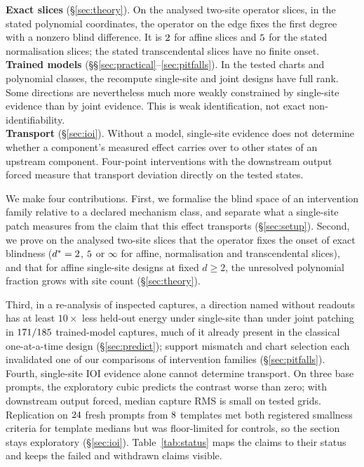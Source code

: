 \documentclass{article}
\theoremstyle{plain}
\theoremstyle{definition}
\begin{document}
\begin{tcolorbox}[title={Three kinds of claim}]
\textbf{Exact slices} (\S\ref{sec:theory}). On the analysed two-site operator slices, in the stated polynomial
coordinates, the operator on the edge fixes the first degree with a nonzero blind difference. It is $2$ for
affine slices and $5$ for the stated normalisation slices; the stated transcendental slices have no finite onset.\\[2pt]
\textbf{Trained models} (\S\S\ref{sec:practical}--\ref{sec:pitfalls}). In the tested charts and polynomial classes,
the recompute single-site and joint designs have full rank. Some directions are nevertheless much more weakly
constrained by single-site evidence than by joint evidence. This is weak identification, not exact
non-identifiability.\\[2pt]
\textbf{Transport} (\S\ref{sec:ioi}). Without a model, single-site evidence does not determine whether a component's
measured effect carries over to other states of an upstream component. Four-point interventions with the downstream output forced measure
that transport deviation directly on the tested states.
\end{tcolorbox}

We make four contributions. First, we formalise the blind space of an intervention family relative to a declared mechanism class, and separate what a single-site patch measures from the claim that this effect transports (\S\ref{sec:setup}). Second, we prove on the analysed two-site slices that the operator fixes the onset of exact blindness ($d^*=2$, $5$ or $\infty$ for affine, normalisation and transcendental slices), and that for affine single-site designs at fixed $d\ge2$, the unresolved polynomial fraction grows with site count (\S\ref{sec:theory}).

Third, in a re-analysis of inspected captures, a direction named without readouts has at least $10\times$ less held-out energy under single-site than under joint patching in $171/185$ trained-model captures, much of it already present in the classical one-at-a-time design (\S\ref{sec:predict}); support mismatch and chart selection each invalidated one of our comparisons of intervention families (\S\ref{sec:pitfalls}). Fourth, single-site IOI evidence alone cannot determine transport. On three base prompts, the exploratory cubic predicts the contrast worse than zero; with downstream output forced, median capture RMS is small on tested grids. Replication on $24$ fresh prompts from $8$ templates met both registered smallness criteria for template medians but was floor-limited for controls, so the section stays exploratory (\S\ref{sec:ioi}). Table~\ref{tab:status} maps the claims to their status and keeps the failed and withdrawn claims visible.
\end{document}

